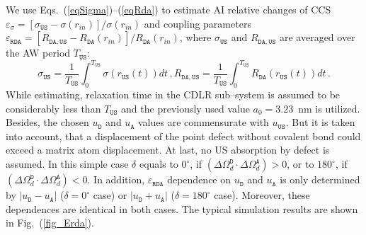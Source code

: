 \documentclass[aip,jap, amsmath,amssymb,reprint]{revtex4-1}
\begin{document}
We use Eqs.~(\ref{eqSigma})--(\ref{eqRda}) to estimate AI relative changes of CCS
$\varepsilon_\sigma=[\sigma_{\mathtt{US}}-\sigma(r_{in})]/\sigma(r_{in})$
and coupling parameters $\varepsilon_{\mathtt{RDA}}=[R_{\mathtt{DA,US}}-R_\mathtt{DA}(r_{in})]/R_\mathtt{DA}(r_{in})$,
where $\sigma_{\mathtt{US}}$ and $R_{\mathtt{DA,US}}$ are averaged over the AW period $T_\mathtt{US}$:
\begin{equation*}
\label{eqAver}
\sigma_{\mathtt{US}}=\frac{1}{T_\mathtt{US}}\int^{T_\mathtt{US}}_0\!\!\!\!\!\!\sigma(r_\mathtt{US}(t))dt\,,
R_{\mathtt{DA,US}}=\frac{1}{T_\mathtt{US}}\int^{T_\mathtt{US}}_0\!\!\!\!\!\!R_{\mathtt{DA}}(r_\mathtt{US}(t))dt\,.
\end{equation*}
While estimating, relaxation time in the CDLR sub--system is assumed to be considerably less than $T_\mathtt{US}$
and the previously used\cite{CDLR:JAP} value $a_0=3.23$~nm is utilized.
Besides, the chosen $u_\mathtt{D}$ and $u_\mathtt{A}$ values are commensurate with $u_\mathtt{US}$.
But it is taken into account, that a displacement of the point defect without covalent bond could exceed a matrix atom displacement.
At last, no US  absorption by defect is assumed.
In this simple case $\delta$ equals to $0^\circ$, if $(\Delta\Omega_d^\mathtt{D}\cdot\Delta\Omega_d^\mathtt{A})>0$,
or to $180^\circ$, if $(\Delta\Omega_d^\mathtt{D}\cdot\Delta\Omega_d^\mathtt{A})<0$.
In addition, $\varepsilon_{\mathtt{RDA}}$ dependence on
$u_\mathtt{D}$ and $u_\mathtt{A}$
is only determined by $|u_\mathtt{D}-u_\mathtt{A}|$ ($\delta=0^\circ$ case) or $|u_\mathtt{D}+u_\mathtt{A}|$ ($\delta=180^\circ$ case).
Moreover, these dependences are identical in both cases.
The typical simulation results are shown in  Fig.~(\ref{fig_Erda}).

\end{document}
